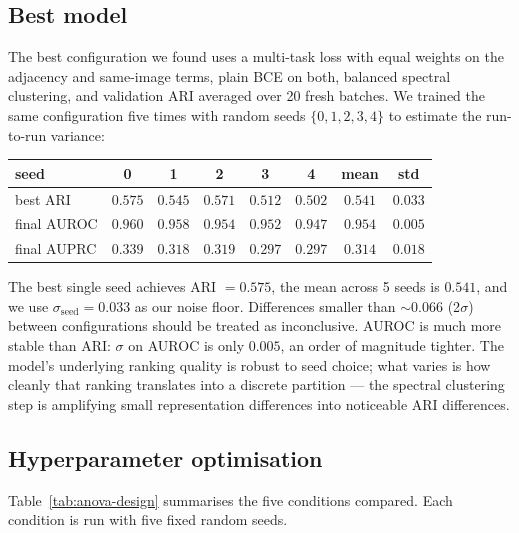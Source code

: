 \documentclass[12pt, a4paper]{article}
\begin{document}
\subsection{Best model}

The best configuration we found uses a multi-task loss with equal weights on the
adjacency and same-image terms, plain BCE on both, balanced spectral clustering,
and validation ARI averaged over 20 fresh batches. We trained the same
configuration five times with random seeds $\{0, 1, 2, 3, 4\}$ to estimate the
run-to-run variance:

\begin{center}
\begin{tabular}{lccccc|cc}
\toprule
\textbf{seed} & 0 & 1 & 2 & 3 & 4 & \textbf{mean} & \textbf{std} \\
\midrule
best ARI       & $0.575$ & $0.545$ & $0.571$ & $0.512$ & $0.502$ & $0.541$ & $\mathbf{0.033}$ \\
final AUROC    & $0.960$ & $0.958$ & $0.954$ & $0.952$ & $0.947$ & $0.954$ & $0.005$ \\
final AUPRC    & $0.339$ & $0.318$ & $0.319$ & $0.297$ & $0.297$ & $0.314$ & $0.018$ \\
\bottomrule
\end{tabular}
\end{center}

The best single seed achieves ARI $= 0.575$, the mean across 5 seeds is
$0.541$, and we use $\sigma_{\text{seed}} = 0.033$ as our noise floor.
Differences smaller than $\sim 0.066$ (2$\sigma$) between configurations
should be treated as inconclusive. AUROC is much more stable than ARI:
$\sigma$ on AUROC is only $0.005$, an order of magnitude tighter. The
model's underlying ranking quality is robust to seed choice; what varies
is how cleanly that ranking translates into a discrete partition --- the
spectral clustering step is amplifying small representation differences
into noticeable ARI differences.

\subsection{Hyperparameter optimisation}
\label{sec:hparam-design}

Table~\ref{tab:anova-design} summarises the five conditions compared. Each
condition is run with five fixed random seeds.
\end{document}
